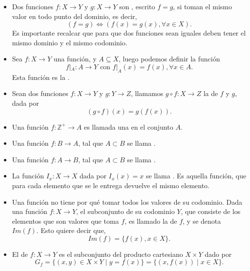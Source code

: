 \documentclass[12pt]{book}
\begin{document}
\begin{itemize}
    \item Dos funciones $f:X\rightarrow Y$ y $g:X\rightarrow Y$ son , escrito $f=g$, si toman el mismo valor en todo punto del dominio, es decir,
    \[(f=g)\iff (f(x)=g(x),\forall x\in X).\]
    Es importante recalcar que para que dos funciones sean iguales deben tener el mismo dominio y el mismo codominio.
    \item Sea $f:X\rightarrow Y$ una función, y $A\subseteq X$, luego podemos definir la función
    \[f|_A:A\rightarrow Y \text{ con } f|_A(x)=f(x),\forall x \in A.\]
    Esta función  es la .
    \item Sean dos funciones $f:X\rightarrow Y$ y $g:Y\rightarrow Z$, llamamos $g\circ f: X\rightarrow Z$ la  de $f$ y $g$, dada por
    \[(g\circ f)(x)=g(f(x)).\]
    \item Una función $f:\mathbb{Z}^+\rightarrow A$ es llamada una  en el conjunto $A$.
    \item Una función $f:B\to A$, tal que $A\subset B$ se llama .
    \item Una función $f:A\to B$, tal que $A\subset B$ se llama .
    \item La función $I_x:X\rightarrow X$ dada por $I_x(x) = x$ se llama . Es aquella función, que para cada elemento que se le entrega devuelve el mismo elemento.
    \item Una función no tiene por qué tomar todos los valores de su codominio. Dada una función $f:X\rightarrow Y$, el subconjunto de su codominio $Y$, que consiste de los elementos que son valores que toma $f$, es llamado la  de $f$, y se denota $Im(f)$. Esto quiere decir que,
    \[Im(f)=\{f(x),x\in X\}.\]
    \item El  de $f:X\rightarrow Y$ es el subconjunto del producto cartesiano $X\times Y$ dado por
    \[G_f=\{(x,y)\in X\times Y \mid y=f(x)\}=\{(x,f(x))\mid x\in X\}.\]
\end{itemize}
\end{document}

